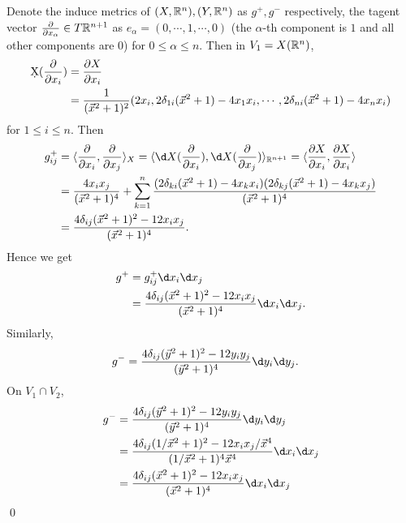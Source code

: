 \begin{enumerate}
Denote the induce metrics of $(X,\mathbb{R}^n), (Y,\mathbb{R}^n)$ as $g^+,g^-$ respectively, the tagent vector $\frac{\partial}{\partial x_\alpha} \in T\mathbb{R}^{n+1}$ as $e_\alpha=(0,\cdots,1,\cdots,0)$ (the $\alpha$-th component is $1$ and all other components are $0$) for $0\leq\alpha\leq n$. Then in $V_1=X(\mathbb{R}^n)$, 
\begin{align*}
	\d X(\frac{\partial}{\partial x_i}) &= \frac{\partial X}{\partial x_i} \\
	& = \frac{1}{(\vec{x}^2+1)^2}(2x_i, 2\delta_{1i}(\vec{x}^2+1)-4x_1 x_i,\cdots, 2\delta_{ni}(\vec{x}^2+1)-4x_n x_i)
\end{align*}
for $1\leq i\leq n$. Then
\begin{align*}
	g^+_{ij} & =\<\frac{\partial}{\partial x_i},\frac{\partial}{\partial x_j}\>_X 
	=\<\d X(\frac{\partial}{\partial x_i}), \d X(\frac{\partial}{\partial x_j})\>_{\r^{n+1}} 
	= \<\frac{\partial X}{\partial x_i}, \frac{\partial X}{\partial x_i}\> \\
	& = \frac{4x_ix_j}{(\vec{x}^2+1)^4} +\sum_{k=1}^n\frac{(2\delta_{ki}(\vec{x}^2+1)-4x_k x_i)(2\delta_{kj}(\vec{x}^2+1)-4x_k x_j)}{(\vec{x}^2+1)^4} \\
	& = \frac{4\delta_{ij}(\vec{x}^2+1)^2-12x_ix_j}{(\vec{x}^2+1)^4}.
\end{align*}
Hence we get 
\begin{align*}
	g^+ &= g^+_{ij} \d x_i \d x_j \\
	& =\frac{4\delta_{ij}(\vec{x}^2+1)^2-12x_ix_j}{(\vec{x}^2+1)^4} \d x_i \d x_j .
\end{align*} Similarly, 
\begin{align*}
	g^- &= \frac{4\delta_{ij}(\vec{y}^2+1)^2-12 y_iy_j}{(\vec{y}^2+1)^4} \d y_i \d y_j.
\end{align*}
On $V_1 \cap V_2$, 
\begin{align*}
	g^- &= \frac{4\delta_{ij}(\vec{y}^2+1)^2-12 y_iy_j}{(\vec{y}^2+1)^4} \d y_i \d y_j \\
	&= \frac{4\delta_{ij}(1/\vec{x}^2+1)^2-12 x_ix_j/\vec{x}^4}{(1/\vec{x}^2+1)^4 \vec{x}^4} \d x_i \d x_j \\
	&= \frac{4\delta_{ij}(\vec{x}^2+1)^2-12x_ix_j}{(\vec{x}^2+1)^4} \d x_i \d x_j
\end{align*}
\qed

\end{enumerate}
